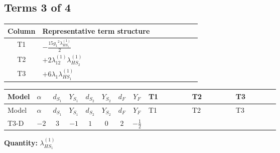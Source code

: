 \documentclass[8pt]{article}
\begin{document}
\begin{landscape}
\subsection*{Terms 3 of 4}
\begin{center}
\begin{tabular}{@{}c >{\raggedright\arraybackslash}p{0.82\linewidth}@{}}
\toprule
Column & Representative term structure \\
\midrule
T1 & \(\displaystyle -\frac{15 {g_1}^2 {\lambda_{HS_1}^{(1)}}}{2}\) \\
\midrule
T2 & \(\displaystyle +2 {\lambda_{12}^{(1)}} {\lambda_{HS_2}^{(1)}}\) \\
\midrule
T3 & \(\displaystyle +6 {\lambda_1} {\lambda_{HS_1}^{(1)}}\) \\
\midrule
\bottomrule
\end{tabular}
\end{center}
\smallskip
\tiny
\begin{longtable}{@{}llcccccc >{\raggedright\arraybackslash}p{0.21\linewidth} >{\raggedright\arraybackslash}p{0.21\linewidth} >{\raggedright\arraybackslash}p{0.21\linewidth}@{}}
\toprule
Model & $\alpha$ & $d_{S_1}$ & $Y_{S_1}$ & $d_{S_2}$ & $Y_{S_2}$ & $d_F$ & $Y_F$ & T1 & T2 & T3 \\
\midrule
\endfirsthead
\toprule
Model & $\alpha$ & $d_{S_1}$ & $Y_{S_1}$ & $d_{S_2}$ & $Y_{S_2}$ & $d_F$ & $Y_F$ & T1 & T2 & T3 \\
\midrule
\endhead
T3-D & $-2$ & $3$ & $-1$ & $1$ & $0$ & $2$ & $-\frac{1}{2}$ & \scriptsize\adjustbox{max width=\linewidth}{$\begin{gathered} -\frac{15 {g_1}^2 {\lambda_{HS_1}^{(1)}}}{2}\end{gathered}$} & \scriptsize\adjustbox{max width=\linewidth}{$\begin{gathered} +2 {\lambda_{12}^{(1)}} {\lambda_{HS_2}^{(1)}}\end{gathered}$} & \scriptsize\adjustbox{max width=\linewidth}{$\begin{gathered} +6 {\lambda_1} {\lambda_{HS_1}^{(1)}}\end{gathered}$} \\
\midrule
\bottomrule
\end{longtable}
\clearpage
\noindent\textbf{Quantity: }$\lambda_{HS_1}^{(1)}$\par\smallskip

\end{landscape}
\end{document}
